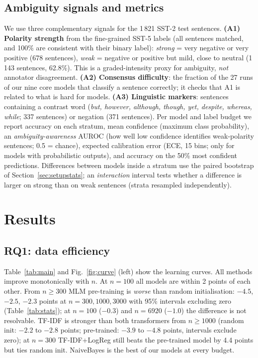 \documentclass[11pt,a4paper]{article}
\begin{document}
\subsection{Ambiguity signals and metrics}\label{sec:ambsetup}
We use three complementary signals for the 1\,821 SST-2 test sentences.
\textbf{(A1) Polarity strength} from the fine-grained SST-5 labels \cite{socher2013recursive} (all sentences matched, and 100\% are consistent with their binary label): \emph{strong} = very negative or very positive (678 sentences), \emph{weak} = negative or positive but mild, close to neutral (1\,143 sentences, 62.8\%). This is a graded-intensity proxy for ambiguity, \emph{not} annotator disagreement.
\textbf{(A2) Consensus difficulty}: the fraction of the 27 runs of our nine core models that classify a sentence correctly; it checks that A1 is related to what is hard for models.
\textbf{(A3) Linguistic markers}: sentences containing a contrast word (\emph{but, however, although, though, yet, despite, whereas, while}; 337 sentences) or negation (371 sentences).
Per model and label budget we report accuracy on each stratum, mean confidence (maximum class probability), an \emph{ambiguity-awareness} AUROC (how well low confidence identifies weak-polarity sentences; 0.5 = chance), expected calibration error (ECE, 15 bins; only for models with probabilistic outputs), and accuracy on the 50\% most confident predictions.
Differences between models inside a stratum use the paired bootstrap of Section~\ref{sec:setupstats}; an \emph{interaction} interval tests whether a difference is larger on strong than on weak sentences (strata resampled independently).

\section{Results}
\subsection{RQ1: data efficiency}
Table~\ref{tab:main} and Fig.~\ref{fig:curve} (left) show the learning curves. All methods improve monotonically with $n$. At $n=100$ all models are within 2 points of each other.
From $n\ge300$ MLM pre-training is \emph{worse} than random initialisation: $-4.5$, $-2.5$, $-2.3$ points at $n=300,1000,3000$ with 95\% intervals excluding zero (Table~\ref{tab:stats}); at $n=100$ ($-0.3$) and $n=6920$ ($-1.0$) the difference is not resolvable.
TF-IDF is stronger than both transformers from $n\ge1000$ (random init: $-2.2$ to $-2.8$ points; pre-trained: $-3.9$ to $-4.8$ points, intervals exclude zero); at $n=300$ TF-IDF+LogReg still beats the pre-trained model by 4.4 points but ties random init.
NaiveBayes is the best of our models at every budget.
\end{document}
